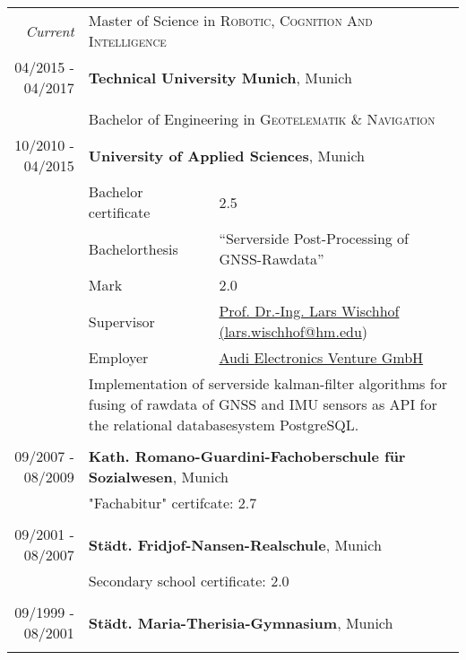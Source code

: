 \documentclass[a4paper,10pt]{article} %
\begin{document}
\begin{tabular}{r|l@{: }p{11cm}}
\emph{Current} & \multicolumn{2}{p{11cm}}{Master of Science in \textsc{Robotic, Cognition And Intelligence}}\\
\textsc{04/2015 - 04/2017} & \multicolumn{2}{p{11cm}}{\textbf{Technical University Munich}, Munich} \\
\multicolumn{3}{c}{}\\
& \multicolumn{2}{p{11cm}}{Bachelor of Engineering in \textsc{Geotelematik \& Navigation}}\\
\textsc{10/2010 - 04/2015} & \multicolumn{2}{p{11cm}}{\textbf{University of Applied Sciences}, Munich} \\
                           $$& \small Bachelor certificate & \small 2.5\\
                           & \small Bachelorthesis & \small ``Serverside Post-Processing of GNSS-Rawdata'' \\
                           & \small Mark           & \small 2.0\\
                           & \small Supervisor     & \small \href{mailto:lars.wischhof@hm.edu}{Prof. Dr.-Ing. Lars Wischhof (lars.wischhof@hm.edu})\\
                           & \small Employer       & \small \href{http://www.audi-electronics-venture.de}{Audi Electronics Venture GmbH} \\
                           & \multicolumn{2}{p{11cm}}{\small Implementation of serverside kalman-filter algorithms for fusing of rawdata of GNSS and IMU sensors as API for the relational databasesystem PostgreSQL.}\\
\multicolumn{3}{c}{}\\
 
 
\textsc{09/2007 - 08/2009} & \multicolumn{2}{p{11cm}}{\textbf{Kath. Romano-Guardini-Fachoberschule für Sozialwesen}, Munich} \\
                           & \multicolumn{2}{p{11cm}}{\small "Fachabitur" certifcate: 2.7}                                         \\
\multicolumn{3}{c}{}                                                                                \\
 
 
\textsc{09/2001 - 08/2007} & \multicolumn{2}{p{11cm}}{\textbf{Städt. Fridjof-Nansen-Realschule}, Munich} \\
                           & \multicolumn{2}{p{11cm}}{\small Secondary school certificate: 2.0} \\
\multicolumn{3}{c}{}\\
 
 
\textsc{09/1999 - 08/2001} & \multicolumn{2}{p{11cm}}{\textbf{Städt. Maria-Therisia-Gymnasium}, Munich} \\
\multicolumn{3}{c}{}\\
\end{tabular}
 
\end{document}
